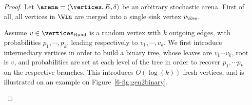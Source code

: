 \begin{proof}
  Let $\arena = (\vertices,E,\delta)$ be an arbitrary stochastic
  arena. First of all, all vertices in $\Win$ are merged into a single
  sink vertex $v_\Eve$.

  Assume $v \in \Randomvertices$ is a random vertex with $k$ outgoing
  edges, with probabilities $p_1, \cdots, p_k$, leading respectively
  to $v_1,\cdots,v_k$. We first introduce intermediary vertices in
  order to build a binary tree, whose leaves are $v_1 \cdots v_k$,
  root is $v$, and probabilities are set at each level of the tree in
  order to recover $p_1, \cdots p_k$ on the respective branches. This
  introduces $O(\log(k))$ fresh vertices, and is illustrated on an
  example on Figure~\ref{6-fig:gen2binary}.

  \begin{figure}[htbp]
    \centering

    
    
    



\end{figure}
\end{proof}
